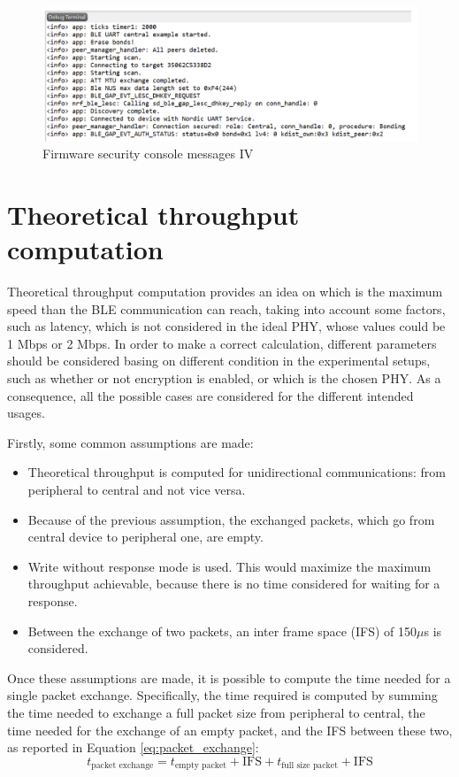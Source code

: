 \documentclass{Configuration_Files/PoliMi3i_thesis}
\begin{document}
\begin{figure}[h]
    \centering
    \includegraphics[scale=0.3]{Firmware_security/Screenshot 2024-07-22 at 22.33.43.png}
    \caption{Firmware security console messages IV}
    \label{firm_sec_5}
\end{figure}


\section{Theoretical throughput computation}

Theoretical throughput computation provides an idea on which is the maximum speed than the BLE communication can reach, taking into account some factors, such as latency, which is not considered in the ideal PHY, whose values could be 1 Mbps or 2 Mbps. In order to make a correct calculation, different parameters should be considered basing on different condition in the experimental setups, such as whether or not encryption is enabled, or which is the chosen PHY. As a consequence, all the possible cases are considered for the different intended usages.

Firstly, some common assumptions are made:
\begin{itemize}
    \item Theoretical throughput is computed for unidirectional communications: from peripheral to central and not vice versa.
    \item Because of the previous assumption, the exchanged packets, which go from central device to peripheral one, are empty.
    \item Write without response mode is used. This would maximize the maximum throughput achievable, because there is no time considered for waiting for a response.
    \item Between the exchange of two packets, an inter frame space (IFS) of 150$\mu$s is considered.
\end{itemize}

Once these assumptions are made, it is possible to compute the time needed for a single packet exchange. Specifically, the time required is computed by summing the time needed to exchange a full packet size from peripheral to central, the time needed for the exchange of an empty packet, and the IFS between these two, as reported in Equation \ref{eq:packet_exchange}:
\begin{equation}
t_{\text{packet exchange}} = t_{\text{empty packet}} + \text{IFS} + t_{\text{full size packet}} + \text{IFS}
\label{eq:packet_exchange}
\end{equation}
\end{document}

